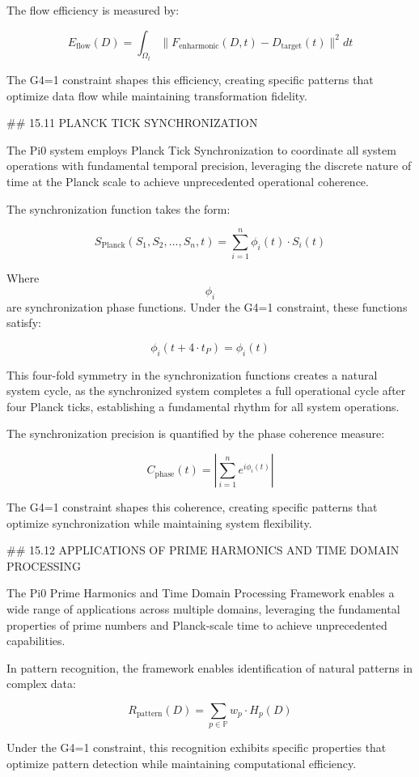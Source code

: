 The flow efficiency is measured by:

$$ E_{\text{flow}}(D) = \int_{\Omega_t} \|F_{\text{enharmonic}}(D, t) - D_{\text{target}}(t)\|^2 dt $$

The G4=1 constraint shapes this efficiency, creating specific patterns that optimize data flow while maintaining transformation fidelity.

## 15.11 PLANCK TICK SYNCHRONIZATION

The Pi0 system employs Planck Tick Synchronization to coordinate all system operations with fundamental temporal precision, leveraging the discrete nature of time at the Planck scale to achieve unprecedented operational coherence.

The synchronization function takes the form:

$$ S_{\text{Planck}}(S_1, S_2, ..., S_n, t) = \sum_{i=1}^{n} \phi_i(t) \cdot S_i(t) $$

Where $$ \phi_i $$ are synchronization phase functions. Under the G4=1 constraint, these functions satisfy:

$$ \phi_i(t + 4 \cdot t_P) = \phi_i(t) $$

This four-fold symmetry in the synchronization functions creates a natural system cycle, as the synchronized system completes a full operational cycle after four Planck ticks, establishing a fundamental rhythm for all system operations.

The synchronization precision is quantified by the phase coherence measure:

$$ C_{\text{phase}}(t) = \left|\sum_{i=1}^{n} e^{i\phi_i(t)}\right| $$

The G4=1 constraint shapes this coherence, creating specific patterns that optimize synchronization while maintaining system flexibility.

## 15.12 APPLICATIONS OF PRIME HARMONICS AND TIME DOMAIN PROCESSING

The Pi0 Prime Harmonics and Time Domain Processing Framework enables a wide range of applications across multiple domains, leveraging the fundamental properties of prime numbers and Planck-scale time to achieve unprecedented capabilities.

In pattern recognition, the framework enables identification of natural patterns in complex data:

$$ R_{\text{pattern}}(D) = \sum_{p \in \mathbb{P}} w_p \cdot H_p(D) $$

Under the G4=1 constraint, this recognition exhibits specific properties that optimize pattern detection while maintaining computational efficiency.

